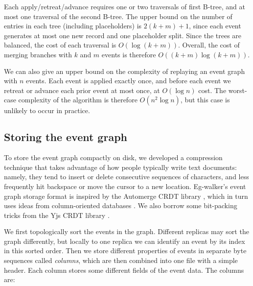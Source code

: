 \documentclass[sigplan,10pt]{acmart}
\newcommand{\algname}{Eg-walker\xspace}
\begin{document}
Each apply/retreat/advance requires one or two traversals of first B-tree, and at most one traversal of the second B-tree.
The upper bound on the number of entries in each tree (including placeholders) is $2(k+m)+1$, since each event generates at most one new record and one placeholder split.
Since the trees are balanced, the cost of each traversal is $O(\log(k+m))$.
Overall, the cost of merging branches with $k$ and $m$ events is therefore $O((k+m) \log(k+m))$.

We can also give an upper bound on the complexity of replaying an event graph with $n$ events.
Each event is applied exactly once, and before each event we retreat or advance each prior event at most once, at $O(\log n)$ cost.
The worst-case complexity of the algorithm is therefore $O(n^2 \log n)$, but this case is unlikely to occur in practice.

\subsection{Storing the event graph}\label{storage}

To store the event graph compactly on disk, we developed a compression technique that takes advantage of how people typically write text documents: namely, they tend to insert or delete consecutive sequences of characters, and less frequently hit backspace or move the cursor to a new location.
\algname's event graph storage format is inspired by the Automerge CRDT library \cite{automerge-storage,automerge-columnar}, which in turn uses ideas from column-oriented databases \cite{Abadi2013,Stonebraker2005}. We also borrow some bit-packing tricks from the Yjs CRDT library \cite{yjs}.

We first topologically sort the events in the graph. Different replicas may sort the graph differently, but locally to one replica we can identify an event by its index in this sorted order.
Then we store different properties of events in separate byte sequences called \emph{columns}, which are then combined into one file with a simple header.
Each column stores some different fields of the event data. The columns are:
\end{document}
